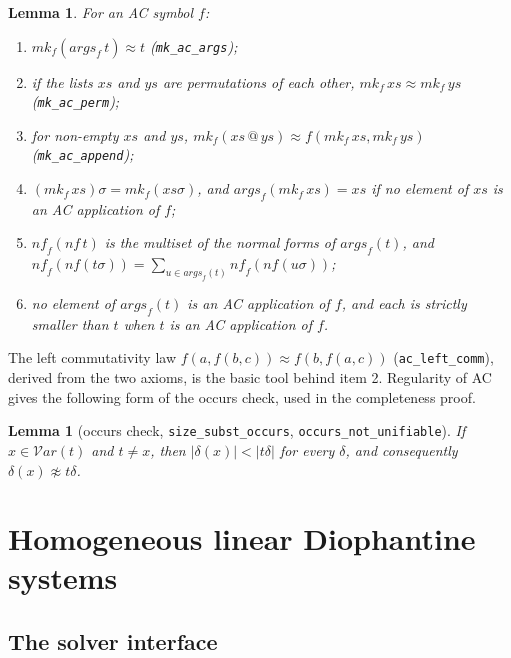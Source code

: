 \documentclass[11pt,a4paper]{article}
\newtheorem{lemma}[theorem]{Lemma}
\theoremstyle{definition}
\theoremstyle{remark}
\newcommand{\isa}[1]{\mbox{\small\texttt{#1}}}
\newcommand{\vars}{\mathcal{V}\mathit{ar}}
\newcommand{\eqAC}{\approx}
\newcommand{\nf}{\mathit{nf}}
\newcommand{\args}{\mathit{args}}
\newcommand{\mkac}{\mathit{mk}}
\begin{document}
\begin{lemma}\label{lem:mk}
  For an AC symbol $f$:
  \begin{enumerate}[nosep]
    \item $\mkac_f(\args_f\,t) \eqAC t$ (\isa{mk\_ac\_args});
    \item if the lists $xs$ and $ys$ are permutations of each other, $\mkac_f\,xs \eqAC \mkac_f\,ys$
          (\isa{mk\_ac\_perm});
    \item for non-empty $xs$ and $ys$, $\mkac_f(xs \mathbin{@} ys) \eqAC f(\mkac_f\,xs,
          \mkac_f\,ys)$ (\isa{mk\_ac\_append});
    \item $(\mkac_f\,xs)\sigma = \mkac_f(xs\sigma)$, and $\args_f(\mkac_f\,xs) = xs$ if no
          element of $xs$ is an AC application of $f$;
    \item $\nf_f(\nf\,t)$ is the multiset of the normal forms of $\args_f(t)$, and
          $\nf_f(\nf(t\sigma)) = \sum_{u\in\args_f(t)} \nf_f(\nf(u\sigma))$;
    \item no element of $\args_f(t)$ is an AC application of $f$, and each is strictly smaller
          than $t$ when $t$ is an AC application of $f$.
  \end{enumerate}
\end{lemma}

The left commutativity law $f(a, f(b, c)) \eqAC f(b, f(a, c))$ (\isa{ac\_left\_comm}), derived
from the two axioms, is the basic tool behind item 2. Regularity of AC gives the following form
of the occurs check, used in the completeness proof.

\begin{lemma}[occurs check, \isa{size\_subst\_occurs}, \isa{occurs\_not\_unifiable}]\label{lem:occurs}
  If $x \in \vars(t)$ and $t \neq x$, then $|\delta(x)| < |t\delta|$ for every $\delta$, and
  consequently $\delta(x) \not\eqAC t\delta$.
\end{lemma}

\section{Homogeneous linear Diophantine systems}\label{sec:dioph}

\subsection{The solver interface}
\end{document}
